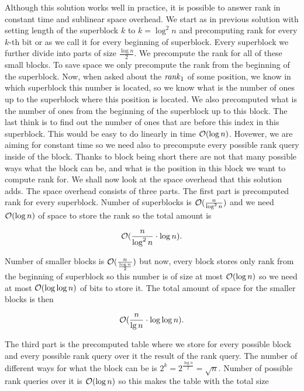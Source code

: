 Although this solution works well in practice, it is possible to answer rank in constant time
and sublinear space overhead. We start as in previous solution with setting length of the
superblock $k$ to $k=\log^2 n$ and precomputing rank for every $k$-th bit or as we call it for
every beginning of superblock. Every superblock we further divide into parts of size
$\frac{\log n}{2}$. We precompute the rank for all of these small blocks. To save space we only
precompute the rank from the beginning of the superblock. Now, when asked about the $\mathit{rank}_1$ of
some position, we know in which superblock this number is located, so we know what is the number
of ones up to the superblock where this position is located. We also precomputed what is the
number of ones from the beginning of the superblock up to this block. The last think is to
find out the number of ones that are before this index in this superblock. This would be easy
to do linearly in time $\mathcal{O}(\log n)$. Hovewer, we are aiming for constant time so we need
also to precompute every possible rank query inside of the block. Thanks to block being short
there are not that many possible ways what the block can be, and what is the position in this
block we want to compute rank for. We shall now look at the space overhead that this solution
adds. The space overhead consists of three parts. The first part is precomputed rank for
every superblock. Number of superblocks is $\mathcal{O}(\frac{n}{\log^2 n})$ and we need
$\mathcal{O}(\log n)$ of space to store the rank so the total amount is

\begin{equation}
    \mathcal{O}(\frac{n}{\log^2 n}\cdot \log n).
    \label{eq:rank_space_1}
\end{equation}

Number of smaller blocks is $\mathcal{O}(\frac{n}{\frac{\log n}{2}})$ but now, every block stores only rank
from the beginning of superblock so this number is of size at most $\mathcal{O}(\log n)$ so we need
at most $\mathcal{O}(\log\log n)$ of bits to store it. The total amount of space for the smaller
blocks is then

\begin{equation}
    \mathcal{O}(\frac{n}{\lg n}\cdot \log\log n).
    \label{eq:rank_space_2}
\end{equation}

The third part is the precomputed table where we store for every possible block and every
possible rank query over it the result of the rank query. The number of different ways for
what the block can be is $2^{k} = 2^{\frac{\log n}{2}} = \sqrt{n}$. Number of possible rank queries
over it is $\mathcal{O}(\log n)$ so this makes the table with the total size 

